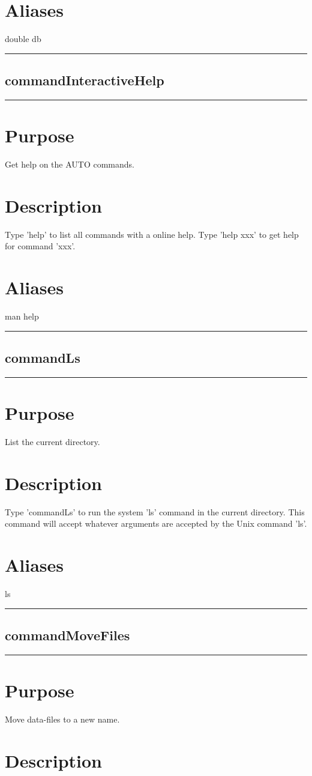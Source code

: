\documentclass[12pt]{report}
\begin{document}
\begin{minipage}{6in}
    \section*{Aliases}
double db \medskip\hrule\end{minipage}\subsection{commandInteractiveHelp} \label{sec:clui_ref_commandInteractiveHelp}\begin{minipage}{6in}\hrule\medskip\section*{Purpose}
Get help on the AUTO commands.\section*{Description}
    
    Type 'help' to list all commands with a online help.
    Type 'help xxx' to get help for command 'xxx'.
    \section*{Aliases}
man help \medskip\hrule\end{minipage}\subsection{commandLs} \label{sec:clui_ref_commandLs}\begin{minipage}{6in}\hrule\medskip\section*{Purpose}
List the current directory.\section*{Description}
    
    Type 'commandLs' to run the system 'ls' command in the current directory.  This
    command will accept whatever arguments are accepted by the Unix command
    'ls'.
    \section*{Aliases}
ls \medskip\hrule\end{minipage}\subsection{commandMoveFiles} \label{sec:clui_ref_commandMoveFiles}\begin{minipage}{6in}\hrule\medskip\section*{Purpose}
Move data-files to a new name.\section*{Description}


\end{minipage}
\end{document}
